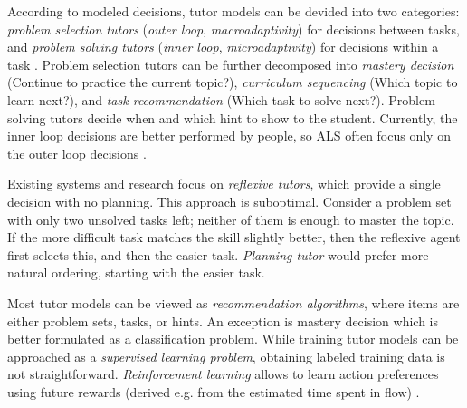 According to modeled decisions, tutor models can be devided into two categories:
\emph{problem selection tutors} (\emph{outer loop}, \emph{macroadaptivity})
for decisions between tasks, %
and \emph{problem solving tutors} (\emph{inner loop}, \emph{microadaptivity})
for decisions within a task \cite{its-learner-models}. %
Problem selection tutors can be further decomposed %
into
\emph{mastery decision} (Continue to practice the current topic?),
\emph{curriculum sequencing} (Which topic to learn next?),
and \emph{task recommendation} (Which task to solve next?).
Problem solving tutors decide when and which hint to show to the
student. %
Currently, the inner loop decisions are better performed by people,
so ALS often focus only on the outer loop decisions \cite{als-future}.

Existing systems and research focus on \emph{reflexive tutors}, which
provide a single decision with no planning. %
This approach is suboptimal. Consider a problem set with only two
unsolved tasks left; neither of them is enough to master the topic.
If the more difficult task matches the skill slightly better, then
the reflexive agent first selects this, and then the easier task.
\emph{Planning tutor} would prefer more natural ordering,
starting with the easier task.

Most tutor models can be viewed as \emph{recommendation algorithms}, %
where items are either problem sets, tasks, or hints.
An exception is mastery decision which is better formulated as a
classification problem.
While training tutor models can be approached as a \emph{supervised learning problem}, %
obtaining labeled training data is not straightforward.
\emph{Reinforcement learning}  \cite{rl}
allows to learn action preferences using future rewards
(derived e.g. from the estimated time spent in flow)
\cite{rl-for-tutors-evaluation}.

